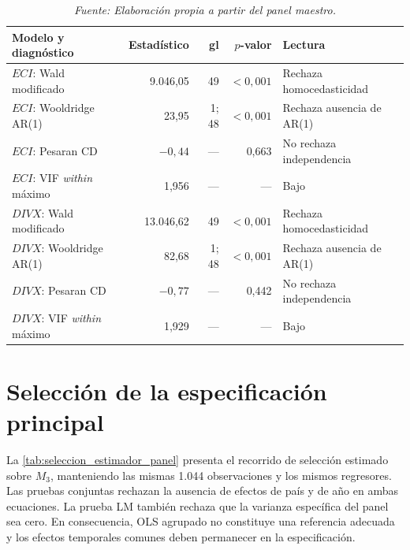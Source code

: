 \documentclass[../../TFM.tex]{subfiles}
\begin{document}
\begin{table}[htbp]
    \centering
    \caption{Diagnósticos residuales y de colinealidad del modelo completo}
    \label{tab:diagnosticos_m3_peer2}
    \begin{tabularx}{\textwidth}{@{}lrrr>{\RaggedRight\arraybackslash}X@{}}
        \toprule
        Modelo y diagnóstico & Estadístico & gl & $p$-valor & Lectura \\
        \midrule
        $ECI$: Wald modificado & 9.046,05 & 49 & $<0,001$ & Rechaza homocedasticidad \\
        $ECI$: Wooldridge AR(1) & 23,95 & 1; 48 & $<0,001$ & Rechaza ausencia de AR(1) \\
        $ECI$: Pesaran CD & $-0,44$ & --- & 0,663 & No rechaza independencia \\
        $ECI$: VIF \textit{within} máximo & 1,956 & --- & --- & Bajo \\
        \addlinespace
        $DIVX$: Wald modificado & 13.046,62 & 49 & $<0,001$ & Rechaza homocedasticidad \\
        $DIVX$: Wooldridge AR(1) & 82,68 & 1; 48 & $<0,001$ & Rechaza ausencia de AR(1) \\
        $DIVX$: Pesaran CD & $-0,77$ & --- & 0,442 & No rechaza independencia \\
        $DIVX$: VIF \textit{within} máximo & 1,929 & --- & --- & Bajo \\
        \bottomrule
    \end{tabularx}
    \caption*{\footnotesize \textit{Nota:} Los diagnósticos utilizan la muestra común de 1.044 observaciones y 49 países. Los VIF se calculan después de retirar los efectos fijos de país y año.}
    \caption*{\footnotesize \textit{Fuente: Elaboración propia a partir del panel maestro.}}
\end{table}


\section{Selección de la especificación principal}
\label{sec:resultados-seleccion-estimador}

La \autoref{tab:seleccion_estimador_panel} presenta el recorrido de selección
estimado sobre $M_3$, manteniendo las mismas 1.044 observaciones y los mismos
regresores. Las pruebas conjuntas rechazan la ausencia de efectos de país y de
año en ambas ecuaciones. La prueba LM también rechaza que la varianza específica
del panel sea cero. En consecuencia, OLS agrupado no constituye una referencia
adecuada y los efectos temporales comunes deben permanecer en la especificación.
\end{document}
